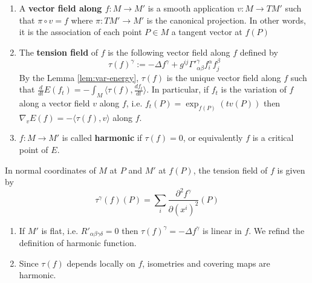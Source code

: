 \begin{definition}
\begin{enumerate}
\item A \textbf{vector field along \(f: M \longrightarrow M'\)} is a smooth application \(v: M\longrightarrow TM'\) such that \(\pi\circ v = f\) where \(\pi: TM' \longrightarrow M'\) is the canonical projection. In other words, it is the association of each point \(P\in M\) a tangent vector at \(f(P)\)
\item The \textbf{tension field} of \(f\) is the following vector field along \(f\) defined by
\[
   \tau(f)^\gamma:= -\Delta f^\gamma +g^{ij}\Gamma'^{\gamma}_{\alpha\beta} f^{\alpha}_{i}f^{\beta}_{j}
   \]
By the Lemma \ref{lem:var-energy}, \(\tau(f)\) is the unique vector field along \(f\)
such that \(\frac{d }{dt}E(f_t) = -\int_M \langle \tau(f), \frac{df_t}{dt}\rangle\). In
particular, if \(f_t\) is the variation of \(f\) along a vector field \(v\) along
\(f\), i.e. \(f_t(P) = \exp_{f(P)}(tv(P))\) then \(\nabla_v E(f) = - \langle \tau(f), v
   \rangle\) along \(f\).
\item \(f: M \longrightarrow M'\) is called \textbf{harmonic} if \(\tau(f)=0\), or equivalently
\(f\) is a critical point of \(E\).
\end{enumerate}
\end{definition}

In normal coordinates of \(M\) at \(P\) and \(M'\) at \(f(P)\), the tension field
of \(f\) is given by
\[
\tau^\gamma(f)(P) = \sum_i \frac{\partial^2 f^\gamma}{\partial (x^i)^2}(P)
\]

\begin{remark}
\begin{enumerate}
\item If \(M'\) is flat, i.e. \(R'_{\alpha\beta\gamma\delta} = 0\) then \(\tau(f)^\gamma
   = -\Delta f^\gamma\) is linear in \(f\). We refind the definition of harmonic function.
\item Since \(\tau(f)\) depends locally on \(f\), isometries and covering maps are
harmonic.
\end{enumerate}
\end{remark}


